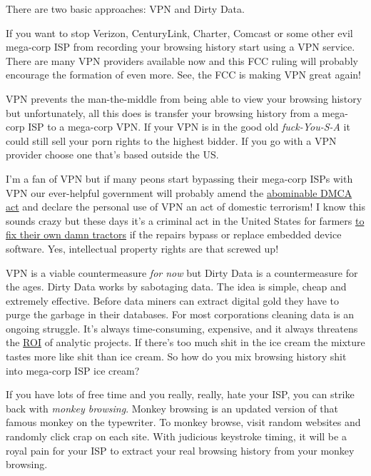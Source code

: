 There are two basic approaches: VPN and Dirty Data.

If you want to stop Verizon, CenturyLink, Charter, Comcast or some other
evil mega-corp ISP from recording your browsing history start using a
VPN service. There are many VPN providers available now and this FCC
ruling will probably encourage the formation of even more. See, the FCC
is making VPN great again!

VPN prevents the man-the-middle from being able to view your browsing
history but unfortunately, all this does is transfer your browsing
history from a mega-corp ISP to a mega-corp VPN. If your VPN is in the
good old \emph{fuck-You-S-A} it could still sell your porn rights to the
highest bidder. If you go with a VPN provider choose one that's based
outside the US.

I'm a fan of VPN but if many peons start bypassing their mega-corp ISPs
with VPN our ever-helpful government will probably amend the
\href{https://en.wikipedia.org/wiki/Digital_Millennium_Copyright_Act}{abominable
DMCA act} and declare the personal use of VPN an act of domestic
terrorism! I know this sounds crazy but these days it's a criminal act
in the United States for farmers
\href{http://modernfarmer.com/2016/07/right-to-repair/}{to fix their own
damn tractors} if the repairs bypass or replace embedded device
software. Yes, intellectual property rights are that screwed up!

VPN is a viable countermeasure \emph{for now} but Dirty Data is a
countermeasure for the ages. Dirty Data works by sabotaging data. The
idea is simple, cheap and extremely effective. Before data miners can
extract digital gold they have to purge the garbage in their databases.
For most corporations cleaning data is an ongoing struggle. It's always
time-consuming, expensive, and it always threatens the
\href{http://www.investopedia.com/terms/r/returnoninvestment.asp}{ROI}
of analytic projects. If there's too much shit in the ice cream the
mixture tastes more like shit than ice cream. So how do you mix browsing
history shit into mega-corp ISP ice cream?

If you have lots of free time and you really, really, hate your ISP, you
can strike back with \emph{monkey browsing}. Monkey browsing is an
updated version of that famous monkey on the typewriter. To monkey
browse, visit random websites and randomly click crap on each site. With
judicious keystroke timing, it will be a royal pain for your ISP to
extract your real browsing history from your monkey browsing.

